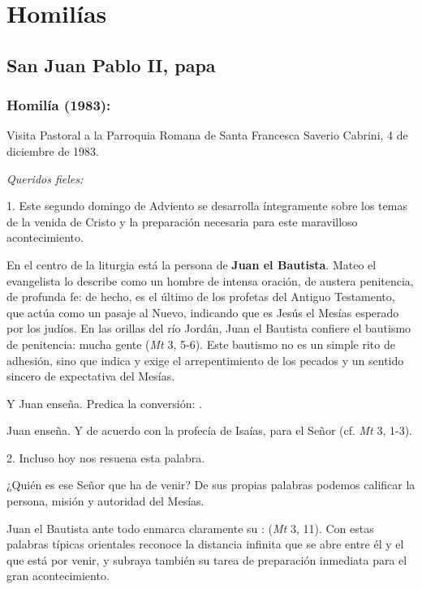 \section{Homilías}

\subsection{San Juan Pablo II, papa}

\subsubsection{Homilía (1983):} 

Visita Pastoral a la Parroquia Romana de Santa Francesca Saverio Cabrini, 4 de diciembre de 1983.

\begin{body}
	\emph{Queridos fieles:}
	
	1. Este segundo domingo de Adviento se desarrolla íntegramente sobre los temas de la venida de Cristo y la preparación necesaria para este maravilloso acontecimiento.
	
	En el centro de la liturgia está la persona de \textbf{Juan el Bautista}. Mateo el evangelista lo describe como un hombre de intensa oración, de austera penitencia, de profunda fe: de hecho, es el último de los profetas del Antiguo Testamento, que actúa como un pasaje al Nuevo, indicando que es Jesús el Mesías esperado por los judíos. En las orillas del río Jordán, Juan el Bautista confiere el bautismo de penitencia: mucha gente  (\emph{Mt} 3, 5-6). Este bautismo no es un simple rito de adhesión, sino que indica y exige el arrepentimiento de los pecados y un sentido sincero de expectativa del Mesías.
	
	Y Juan enseña. Predica la conversión: .
	
	Juan enseña. Y de acuerdo con la profecía de Isaías,  para el Señor (cf. \emph{Mt} 3, 1-3).
	
	2. Incluso hoy nos resuena esta palabra.
	
	¿Quién es ese Señor que ha de venir? De sus propias palabras podemos calificar la persona, misión y autoridad del Mesías.
	
	Juan el Bautista ante todo enmarca claramente su :  (\emph{Mt} 3, 11). Con estas palabras típicas orientales reconoce la distancia infinita que se abre entre él y el que está por venir, y subraya también su tarea de preparación inmediata para el gran acontecimiento.
	

\end{body}

